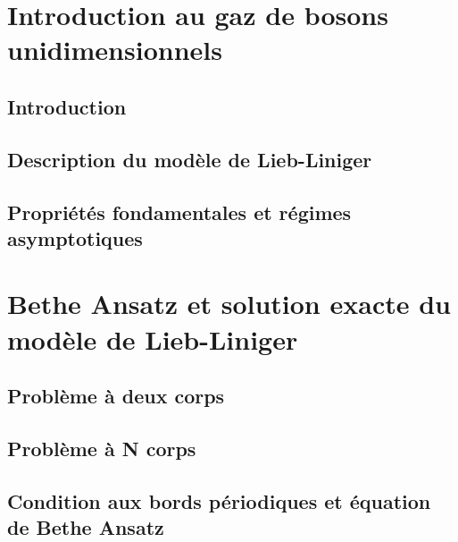 \chapter{Introduction au gaz de bosons unidimensionnels}

\minitoc

%

\section*{Introduction}
%

\section{Description du modèle de Lieb-Liniger}

\section{Propriétés fondamentales et régimes asymptotiques}

\chapter{Bethe Ansatz et solution exacte du modèle de Lieb-Liniger}
\minitoc
\section{Problème à deux corps}
\section{Problème à N corps}
\section{Condition aux bords périodiques et équation de Bethe Ansatz}


